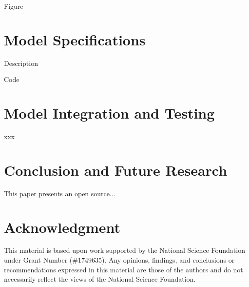 \documentclass[conference]{IEEEtran}
\begin{document}
Figure 



\section{Model Specifications}\label{sec:Specs}
Description

Code

\section{Model Integration and Testing}\label{sec:Integration}
xxx

\section{Conclusion and Future Research}\label{sec:Concl}
This paper presents an open source...

\section*{Acknowledgment}
This material is based upon work supported by the National Science Foundation under Grant Number (\#1749635). Any opinions, findings, and conclusions or recommendations expressed in this material are those of the authors and do not necessarily reflect the views of the National Science Foundation.



\end{document}
